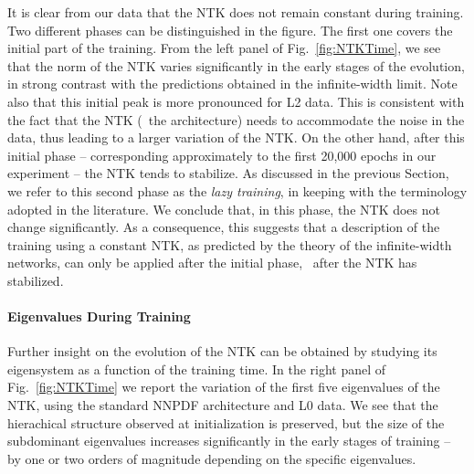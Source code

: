 It is clear from our data that the NTK does not remain constant during training.
Two different phases can be distinguished in the figure. The first one covers
the initial part of the training. From the left panel of Fig.~\ref{fig:NTKTime},
we see that the norm of the NTK varies significantly in the early stages of the
evolution, in strong contrast with the predictions obtained in the
infinite-width limit. Note also that this initial peak is more pronounced for L2
data. This is consistent with the fact that the NTK (\ie\ the architecture)
needs to accommodate the noise in the data, thus leading to a larger variation
of the NTK. On the other hand, after this initial phase -- corresponding
approximately to the first 20,000 epochs in our experiment -- the NTK tends to
stabilize. As discussed in the previous Section, we refer to this second phase
as the \textit{lazy training}, in keeping with the terminology adopted in the
literature. We conclude that, in this phase, the NTK does not change
significantly. As a consequence, this suggests that a description of the
training using a constant NTK, as predicted by the theory of the infinite-width
networks, can only be applied after the initial phase, \ie\ after the NTK has
stabilized. 

\FloatBarrier

\paragraph{Eigenvalues During Training}

Further insight on the evolution of the NTK can be obtained by studying its
eigensystem as a function of the training time. In the right panel of
Fig.~\ref{fig:NTKTime} we report the variation of the first five eigenvalues of
the NTK, using the standard NNPDF architecture and L0 data. We see that the
hierachical structure observed at initialization is preserved, but the size of
the subdominant eigenvalues increases significantly in the early stages of
training -- by one or two orders of magnitude depending on the specific
eigenvalues. 

